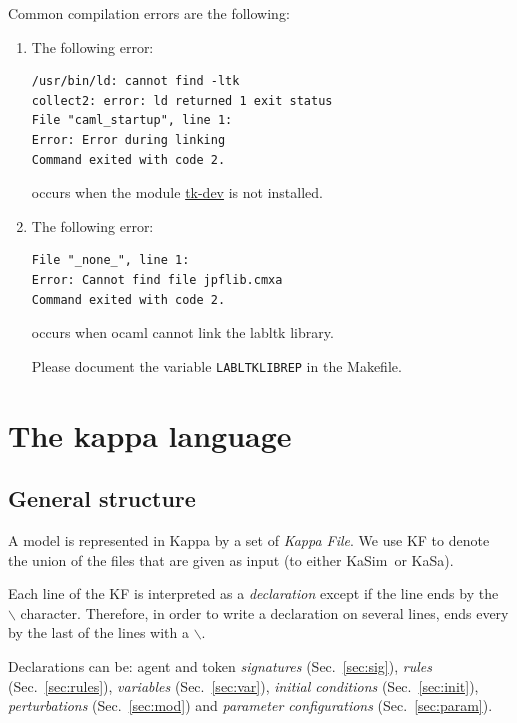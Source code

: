 \documentclass[11pt]{book}
\def\KaSim{\textsf{KaSim}}
\def\KaSa{\textsf{KaSa}}
\def\ttt#1{\texttt{#1}}
\def\bs{\backslash}
\begin{document}
Common compilation errors are the following:
\begin{enumerate}
\item The following error:

\begin{verbatim}
/usr/bin/ld: cannot find -ltk
collect2: error: ld returned 1 exit status
File "caml_startup", line 1:
Error: Error during linking
Command exited with code 2.
\end{verbatim}

occurs when the module  \href{http://www.tcl.tk/}{tk-dev} is not installed.
\item The following error:

\begin{verbatim}
File "_none_", line 1:
Error: Cannot find file jpflib.cmxa
Command exited with code 2.
\end{verbatim}

occurs when ocaml cannot link the labltk library.

Please document the variable \texttt{LABLTKLIBREP} in the Makefile.

\end{enumerate}

\chapter{The kappa language}\label{chap:kappa}

\section{General structure}
A model is represented in Kappa by a set of \emph{Kappa File}. We use
KF to denote the union of the files that are given
as input (to either \KaSim~or \KaSa).

Each line of the KF is interpreted as a
\emph{declaration} except if the line ends by
the~{\textquotesingle} \ttt{$\bs$}{\textquotesingle}
character. Therefore, in order to write a
declaration on several lines, ends every by the
last of the lines with a \ttt{$\bs$}.

Declarations can be: agent and token \emph{signatures}
(Sec.~\ref{sec:sig}), \emph{rules} (Sec.~\ref{sec:rules}),
\emph{variables} (Sec.~\ref{sec:var}), \emph{initial
  conditions} (Sec.~\ref{sec:init}),
\emph{perturbations} (Sec.~\ref{sec:mod}) and
\emph{parameter configurations} (Sec.~\ref{sec:param}).
\end{document}
